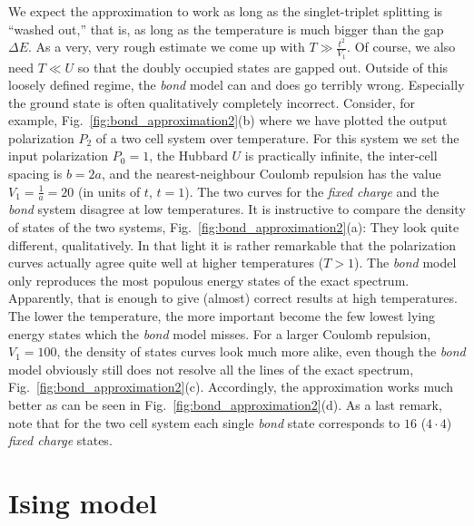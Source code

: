 We expect the approximation to work as long as the
singlet-triplet splitting is ``washed out,'' that is, as long as the temperature
is much bigger than the gap $\Delta E$. As a very, very rough estimate we come
up with $T \gg \frac{t^2}{V_1}$. Of course, we also need $T \ll U$ so that the
doubly occupied states are gapped out. Outside of this loosely defined regime,
the \emph{bond} model can and does go terribly wrong. Especially the ground
state is often qualitatively completely incorrect. Consider, for example,
Fig.~\ref{fig:bond_approximation2}(b) where we have plotted the output
polarization $P_2$ of a two cell system over temperature. For this system we set
the input polarization $P_0 = 1$, the Hubbard $U$ is practically infinite, the
inter-cell spacing is $b = 2 a$, and the nearest-neighbour Coulomb repulsion has
the value $V_1 = \frac{1}{a} = 20$ (in units of $t$, $t=1$). The two curves for
the \emph{fixed charge} and the \emph{bond} system disagree at low temperatures.
It is instructive to compare the density of states of the two systems,
Fig.~\ref{fig:bond_approximation2}(a): They look quite different, qualitatively.
In that light it is rather remarkable that the polarization curves actually
agree quite well at higher temperatures ($T > 1$). The \emph{bond} model only
reproduces the most populous energy states of the exact spectrum. Apparently,
that is enough to give (almost) correct results at high temperatures. The lower
the temperature, the more important become the few lowest lying energy states
which the \emph{bond} model misses. For a larger Coulomb repulsion, $V_1 = 100$,
the density of states curves look much more alike, even though the \emph{bond}
model obviously still does not resolve all the lines of the exact spectrum,
Fig.~\ref{fig:bond_approximation2}(c). Accordingly, the approximation works much
better as can be seen in Fig.~\ref{fig:bond_approximation2}(d). As a last
remark, note that for the two cell system each single \emph{bond} state
corresponds to $16$ ($4 \cdot 4$) \emph{fixed charge} states.


\section{Ising model}

